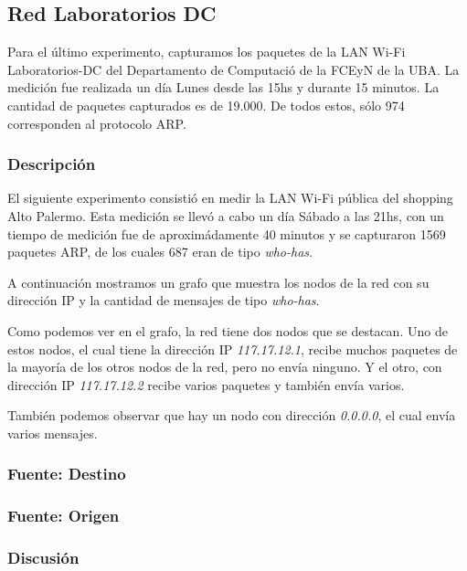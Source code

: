 \subsection{Red Laboratorios DC}

Para el último experimento, capturamos los paquetes de la LAN Wi-Fi Laboratorios-DC del Departamento de Computació de la FCEyN de la UBA. La medición fue realizada un día Lunes desde las 15hs y durante 15 minutos. La cantidad de paquetes capturados es de 19.000. De todos estos, sólo 974 corresponden al protocolo ARP.

\subsubsection{Descripción}

El siguiente experimento consistió en medir la LAN Wi-Fi pública del shopping Alto Palermo. Esta medición se llevó a cabo un día Sábado a las 21hs, con un tiempo de medición fue de aproximádamente 40 minutos y se capturaron 1569 paquetes ARP, de los cuales 687 eran de tipo \emph{who-has}.

A continuación mostramos un grafo que muestra los nodos de la red con su dirección IP y la cantidad de mensajes de tipo \emph{who-has}.


Como podemos ver en el grafo, la red tiene dos nodos que se destacan. Uno de estos nodos, el cual tiene la dirección IP \emph{117.17.12.1}, recibe muchos paquetes de la mayoría de los otros nodos de la red, pero no envía ninguno. Y el otro, con dirección IP \emph{117.17.12.2} recibe varios paquetes y también envía varios.

También podemos observar que hay un nodo con dirección \emph{0.0.0.0}, el cual envía varios mensajes. %

\subsubsection{Fuente: Destino}


\subsubsection{Fuente: Origen}



\subsubsection{Discusión}
